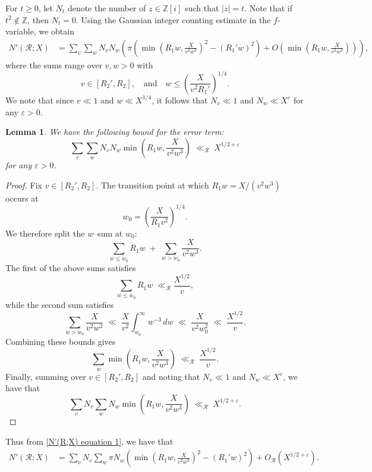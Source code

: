 \documentclass{amsart}
\newcommand{\Z}{\mathbb{Z}}
\theoremstyle{plain}
\newtheorem{lemma}[theorem]{Lemma}
\theoremstyle{definition}
\theoremstyle{remark}
\numberwithin{equation}{section}
\begin{document}
\noindent For $t\geq 0$, let $N_t$ denote the number of $z\in \Z[i]$ such that $|z|=t$. Note that if $t^2\notin \Z$, then $N_t=0$. Using the Gaussian integer counting estimate in the $f$-variable, we obtain
\begin{equation}\label{N'(R;X) equation 1}
\begin{aligned}
N'(\mathcal R;X)
&=
\sum_{v}\sum_{w}
N_v N_w\left(
\pi\left(
\min\!\left(R_1w,\frac{X}{v^2w^3}\right)^2
-
(R_1'w)^2
\right)
+
O\!\left(
\min\!\left(R_1w,\frac{X}{v^2w^3}\right)
\right)
\right),
\end{aligned}
\end{equation}
where the sums range over $v,w>0$ with
\[
v\in[R_2',R_2],
\quad \text{and}\quad
w\le\left(\frac{X}{v^2R_1'}\right)^{1/4}.
\]
We note that since $v\ll 1$ and $w\ll X^{1/4}$, it follows that $N_v\ll 1$ and $N_w\ll X^\varepsilon$ for any $\varepsilon>0$.

\begin{lemma}
    We have the following bound for the error term:
\[
\sum_{v}\sum_{w} N_v N_w
\min\!\left(R_1w,\frac{X}{v^2w^3}\right)
\;\ll_{\mathcal R}\;
X^{1/2+\varepsilon}
\]
for any $\varepsilon >0$.
\end{lemma}
\begin{proof}
Fix $v\in[R_2',R_2]$.  The transition point at which
$R_1w=X/(v^2w^3)$ occurs at
\[
w_0=\left(\frac{X}{R_1v^2}\right)^{1/4}.
\]
We therefore split the $w$--sum at $w_0$:
\[
\sum_{w\le w_0} R_1w
\;+\;
\sum_{w>w_0}\frac{X}{v^2w^3}.
\]
\noindent The first of the above sums satisfies
\[
\sum_{w\le w_0} R_1w
\;\ll_{\mathcal R}
\frac{X^{1/2}}{v},
\]
while the second sum satisfies
\[
\sum_{w>w_0}\frac{X}{v^2w^3}
\;\ll\;
\frac{X}{v^2}\int_{w_0}^{\infty}w^{-3}\,dw
\;\ll \;
\frac{X}{v^2w_0^2}
\;\ll\;
\frac{X^{1/2}}{v}.
\]
\noindent Combining these bounds gives
\[
\sum_{w}
\min\!\left(R_1w,\frac{X}{v^2w^3}\right)
\;\ll_{\mathcal R}\;
\frac{X^{1/2}}{v}.
\]
Finally, summing over $v\in[R_2',R_2]$ and noting that $N_v\ll 1$ and $N_w\ll X^{\varepsilon}$, we have that
\[
\sum_{v}N_v \sum_{w} N_w
\min\!\left(R_1w,\frac{X}{v^2w^3}\right)
\;\ll_{\mathcal R}\;
X^{1/2+\varepsilon}.
\]
\end{proof}

\noindent Thus from \eqref{N'(R;X) equation 1}, we have that
\begin{equation}\label{eq:Nprime-sum-reduction}
\begin{aligned}
N'(\mathcal R;X)
&=
\sum_{v}N_v\sum_{w}
\pi N_w\left(
\min\!\left(R_1w,\frac{X}{v^2w^3}\right)^2
-
(R_1'w)^2
\right)
+
O_{\mathcal R}(X^{1/2+\varepsilon}).
\end{aligned}
\end{equation}
\end{document}
